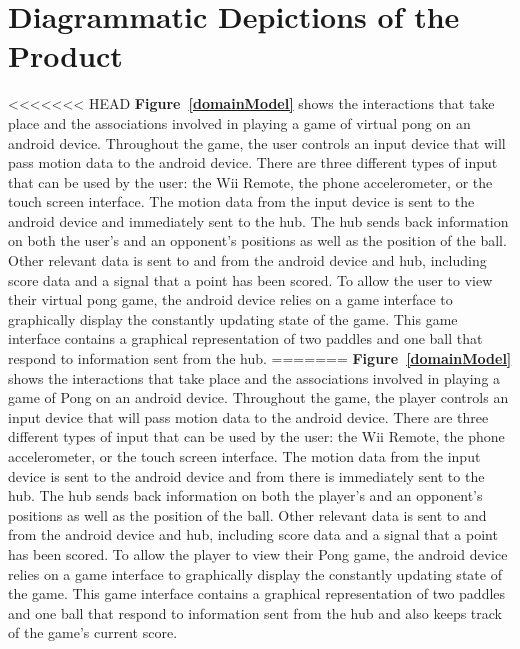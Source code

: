\documentclass[12pt]{article}
\begin{document}
\section{Diagrammatic Depictions of the Product}
\label{sec:diagrams}
<<<<<<< HEAD
\textbf{Figure~\ref{domainModel}} shows the interactions that take place and the associations involved in playing a game of virtual pong on an android device.  Throughout the game, the user controls an input device that will pass motion data to the android device.  There are three different types of input that can be used by the user: the Wii Remote, the phone accelerometer, or the touch screen interface.  The motion data from the input device is sent to the android device and immediately sent to the hub.  The hub sends back information on both the user's and an opponent's positions as well as the position of the ball.  Other relevant data is sent to and from the android device and hub, including score data and a signal that a point has been scored.  To allow the user to view their virtual pong game, the android device relies on a game interface to graphically display the constantly updating state of the game.  This game interface contains a graphical representation of two paddles and one ball that respond to information sent from the hub.
=======
\textbf{Figure~\ref{domainModel}} shows the interactions that take place and the associations involved in playing a game of Pong on an android device.  Throughout the game, the player controls an input device that will pass motion data to the android device.  There are three different types of input that can be used by the user: the Wii Remote, the phone accelerometer, or the touch screen interface.  The motion data from the input device is sent to the android device and from there is immediately sent to the hub.  The hub sends back information on both the player's and an opponent's positions as well as the position of the ball.  Other relevant data is sent to and from the android device and hub, including score data and a signal that a point has been scored.  To allow the player to view their Pong game, the android device relies on a game interface to graphically display the constantly updating state of the game.  This game interface contains a graphical representation of two paddles and one ball that respond to information sent from the hub and also keeps track of the game's current score.
\end{document}
